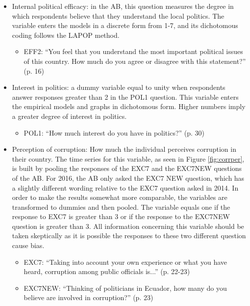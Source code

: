 \documentclass[floatsintext,man]{apa7}\usepackage[]{graphicx}\usepackage[]{color}
\begin{document}
\begin{itemize}
\item Internal political efficacy: in the AB, this question measures the degree in which respondents believe that they understand the local politics. The variable enters the models in a discrete form from 1-7, and its dichotomous coding follows the LAPOP method. 
  \begin{itemize}
    \item EFF2: \enquote{You feel that you understand the most important political issues
of this country. How much do you agree or disagree with this statement?} (p. 16)
  \end{itemize}  
  
\item Interest in politics: a dummy variable equal to unity when respondents answer responses greater than 2 in the POL1 question. This variable enters the empirical models and graphs in dichotomous form. Higher numbers imply a greater degree of interest in politics. 
  \begin{itemize}
    \item POL1: \enquote{How much interest do you have in politics?} (p. 30)
  \end{itemize}  
  
  \item Perception of corruption: How much the individual perceives corruption in their country. The time series for this variable, as seen in Figure \ref{fig:corrper}, is built by pooling the responses of the EXC7 and the EXC7NEW questions of the AB. For 2016, the AB only asked the EXC7 NEW question, which has a slightly different wording relative to the EXC7 question asked in 2014. In order to make the results somewhat more comparable, the variables are transformed to dummies and then pooled. The variable equals one if the response to EXC7 is greater than 3 or if the response to the EXC7NEW question is greater than 3. All information concerning this variable should be taken skeptically as it is possible the responses to these two different question cause bias. 
  \begin{itemize}
    \item EXC7: \enquote{Taking into account your own experience or what you have heard,
corruption among public officials is...} (p. 22-23)
    \item EXC7NEW: \enquote{Thinking of politicians in Ecuador, how many do you believe are
involved in corruption?} (p. 23)
  \end{itemize} 
  

\end{itemize}
\end{document}
